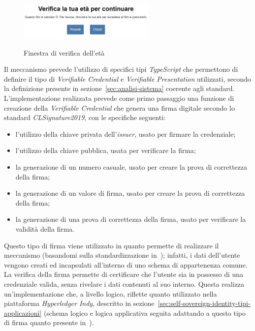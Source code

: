 \begin{figure}[ht]
    \centering
    \includegraphics[width=0.6\textwidth, alt={Finestra visualizzata di verifica dell'età}]{immagini/frontend/age-verification.png}
    \caption{Finestra di verifica dell'età}\label{fig:verifica-eta}
\end{figure}

Il meccanismo prevede l'utilizzo di specifici tipi \textit{TypeScript} che permettono di definire il tipo di \textit{Verifiable Credential} e \textit{Verifiable Presentation}
utilizzati, secondo la definizione presente in sezione~\ref{sec:analisi-sistema} coerente agli standard.
L'implementazione realizzata prevede come primo passaggio una funzione di creazione della \textit{Verifiable Credential} che genera una firma digitale secondo lo standard \textit{CLSignature2019}, con le specifiche seguenti:
\begin{itemize}
    \item l'utilizzo della chiave privata dell'\textit{issuer}, usato per firmare la credenziale;
    \item l'utilizzo della chiave pubblica, usata per verificare la firma;
    \item la generazione di un numero casuale, usato per creare la prova di correttezza della firma;
    \item la generazione di un valore di firma, usato per creare la prova di correttezza della firma;
    \item la generazione di una prova di correttezza della firma, usato per verificare la validità della firma.
\end{itemize}
Questo tipo di firma viene utilizzato in quanto permette di realizzare il meccanismo  (basandomi sulla standardizzazione in~\cite{site:zkpstandard}); infatti, i dati dell'utente vengono creati ed incapsulati
all'interno di uno schema di appartenenza comune. La verifica della firma permette di certificare che l'utente sia in possesso di una credenziale valida, senza rivelare
i dati contenuti al suo interno. Questa realizza un'implementazione che, a livello logico, riflette quanto utilizzato nella piattaforma 
\textit{Hyperledger Indy}, descritto in sezione~\ref{sec:self-sovereign-identity-tipi-applicazioni} (schema logico e logica applicativa seguita adattando a questo tipo di firma
quanto presente in~\cite{site:anoncreds}).

